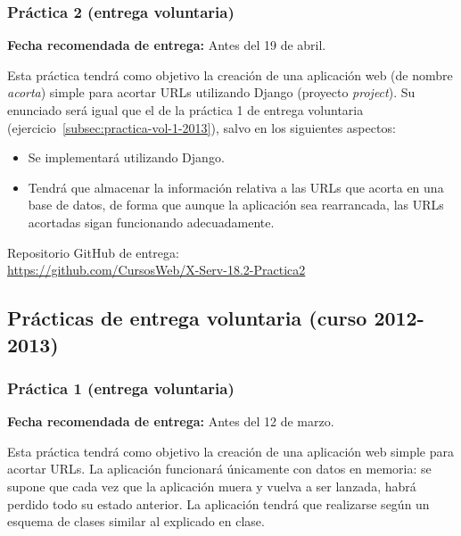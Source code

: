 \subsubsection{Práctica 2 (entrega voluntaria)}
\label{subsec:practica-vol-2-2013}

\textbf{Fecha recomendada de entrega:} Antes del 19 de abril.

Esta práctica tendrá como objetivo la creación de una aplicación web (de nombre \emph{acorta}) simple para acortar URLs utilizando Django (proyecto \emph{project}). Su enunciado será igual que el de la práctica 1 de entrega voluntaria (ejercicio~\ref{subsec:practica-vol-1-2013}), salvo en los siguientes aspectos:

\begin{itemize}
\item Se implementará utilizando Django.
\item Tendrá que almacenar la información relativa a las URLs que acorta en una base de datos, de forma que aunque la aplicación sea rearrancada, las URLs acortadas sigan funcionando adecuadamente.
\end{itemize}

Repositorio GitHub de entrega: \\
\url{https://github.com/CursosWeb/X-Serv-18.2-Practica2}


\subsection{Prácticas de entrega voluntaria (curso 2012-2013)}

\subsubsection{Práctica 1 (entrega voluntaria)}
\label{subsec:practica-vol-1-2012}

\textbf{Fecha recomendada de entrega:} Antes del 12 de marzo.

Esta práctica tendrá como objetivo la creación de una aplicación web simple para acortar URLs. La aplicación funcionará únicamente con datos en memoria: se supone que cada vez que la aplicación muera y vuelva a ser lanzada, habrá perdido todo su estado anterior. La aplicación tendrá que realizarse según un esquema de clases similar al explicado en clase.

